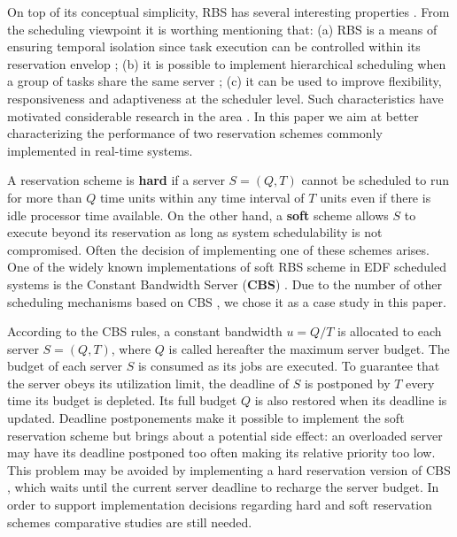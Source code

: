 \documentclass[times, 10pt,twocolumn]{article}
\begin{document}
On top of its conceptual simplicity, RBS has several interesting
properties \cite{steffens.ea03:resource}. From the scheduling
viewpoint it is worthing mentioning that: (a) RBS is a means of
ensuring temporal isolation since task execution can be controlled
within its reservation envelop
\cite{abeni.ea04:resource,mercer.ea94:processor,sprunt.ea89:aperiodic,spuri.ea96:scheduling};
(b) it is possible to implement hierarchical scheduling when a group
of tasks share the same server
\cite{davis.ea05:hierarchical,davis.ea08:investigation}; (c) it can be
used to improve flexibility, responsiveness and adaptiveness at the
scheduler level.  Such characteristics have motivated considerable
research in the area
\cite{abeni.ea99:adaptive,caccamo.ea00:capacity,caccamo.ea05:efficient,oliveira.ea08:dynamic,oliveira.ea09:dynamic,lin.ea05:improving}.
In this paper we aim at better characterizing the performance of two
reservation schemes commonly implemented in real-time systems.

A reservation scheme is \textbf{hard} if a server
$S = (Q,T)$ cannot be scheduled to run for more than $Q$ time
units within any time interval of $T$ units even if there is idle
processor time available. On the other hand, a \textbf{soft} scheme
allows $S$ to execute beyond its reservation as long as system
schedulability is not compromised. Often the decision of implementing
one of these schemes arises. One of the widely known implementations
of soft RBS scheme in EDF scheduled systems is the Constant Bandwidth
Server (\textbf{CBS}) \cite{abeni.ea04:resource}.  Due to the number
of other scheduling mechanisms based on CBS
\cite{abeni.ea05:qos,caccamo.ea00:capacity,caccamo.ea05:efficient,lipari.ea00:greedy},
we chose it as a case study in this paper.

According to the CBS rules, a constant bandwidth $u = Q/T$ is
allocated to each server $S = (Q,T)$, where $Q$ is called hereafter
the maximum server budget. The budget of each server $S$ is consumed
as its jobs are executed. To guarantee that the server obeys its
utilization limit, the deadline of $S$ is postponed by $T$ every time
its budget is depleted.  Its full budget $Q$ is also restored when its
deadline is updated.  Deadline postponements make it possible to
implement the soft reservation scheme but brings about a potential
side effect: an overloaded server may have its deadline postponed too
often making its relative priority too low.  This problem may be
avoided by implementing a hard reservation version of CBS
\cite{buttazzo05:soft}, which waits until the current server deadline
to recharge the server budget. In order to support implementation
decisions regarding hard and soft reservation schemes comparative
studies are still needed.
\end{document}
